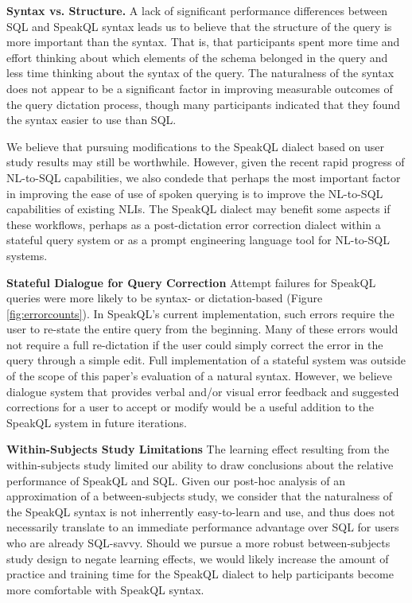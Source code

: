 \textbf{Syntax vs. Structure.} A lack of significant performance differences between SQL and SpeakQL syntax leads us to believe that the structure of the query is more important than the syntax.
That is, that participants spent more time and effort thinking about which elements of the schema belonged in the query and less time thinking about the syntax of the query.
The naturalness of the syntax does not appear to be a significant factor in improving measurable outcomes of the query dictation process, though many participants indicated that they found the syntax easier to use than SQL. 

We believe that pursuing modifications to the SpeakQL dialect based on user study results may still be worthwhile. 
However, given the recent rapid progress of NL-to-SQL capabilities, we also condede that perhaps the most important factor in improving the ease of use of spoken querying is to improve the NL-to-SQL capabilities of existing NLIs.
The SpeakQL dialect may benefit some aspects if these workflows, perhaps as a post-dictation error correction dialect within a stateful query system or as a prompt engineering language tool for NL-to-SQL systems.

\textbf{Stateful Dialogue for Query Correction} Attempt failures for SpeakQL queries were more likely to be syntax- or dictation-based (Figure \ref{fig:errorcounts}). In SpeakQL's current implementation, such errors require the user to re-state the entire query from the beginning. Many of these errors would not require a full re-dictation if the user could simply correct the error in the query through a simple edit. Full  implementation of a stateful system was outside of the scope of this paper's evaluation of a natural syntax. However, we believe dialogue system that provides verbal and/or visual error feedback and suggested corrections for a user to accept or modify would be a useful addition to the SpeakQL system in future iterations.

\textbf{Within-Subjects Study Limitations} The learning effect resulting from the within-subjects study limited our ability to draw conclusions about the relative performance of SpeakQL and SQL. 
Given our post-hoc analysis of an approximation of a between-subjects study, we consider that the naturalness of the SpeakQL syntax is not inherrently easy-to-learn and use, and thus does not necessarily translate to an immediate performance advantage over SQL for users who are already SQL-savvy. 
Should we pursue a more robust between-subjects study design to negate learning effects, we would likely increase the amount of practice and training time for the SpeakQL dialect to help participants become more comfortable with SpeakQL syntax. 




